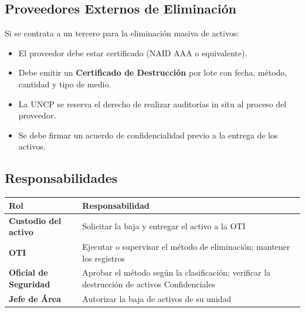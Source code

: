 \documentclass[10pt,letterpaper]{article}
\begin{document}
\subsection{Proveedores Externos de
Eliminación}\label{proveedores-externos-de-eliminaciuxf3n}

Si se contrata a un tercero para la eliminación masiva de activos:

\begin{itemize}
\tightlist
\item
  El proveedor debe estar certificado (NAID AAA o equivalente).
\item
  Debe emitir un \textbf{Certificado de Destrucción} por lote con fecha,
  método, cantidad y tipo de medio.
\item
  La UNCP se reserva el derecho de realizar auditorías in situ al
  proceso del proveedor.
\item
  Se debe firmar un acuerdo de confidencialidad previo a la entrega de
  los activos.
\end{itemize}

\subsection{Responsabilidades}\label{responsabilidades}

{\setlength{\RaggedRightRightskip}{0pt plus 5em}\small\sloppy \begin{longtable}[]{@{}
  >{\hspace{0pt}\RaggedRight\arraybackslash}p{}
  >{\hspace{0pt}\RaggedRight\arraybackslash}p{}@{}}
\toprule\noalign{}
\begin{minipage}[b]{\linewidth}\raggedright
Rol
\end{minipage} & \begin{minipage}[b]{\linewidth}\raggedright
Responsabilidad
\end{minipage} \\
\midrule\noalign{}
\endhead
\bottomrule\noalign{}
\endlastfoot
\textbf{Custodio del activo} & Solicitar la baja y entregar el activo a
la OTI \\
\textbf{OTI} & Ejecutar o supervisar el método de eliminación; mantener
los registros \\
\textbf{Oficial de Seguridad} & Aprobar el método según la
clasificación; verificar la destrucción de activos Confidenciales \\
\textbf{Jefe de Área} & Autorizar la baja de activos de su unidad \\
\end{longtable}\normalsize}
\end{document}
